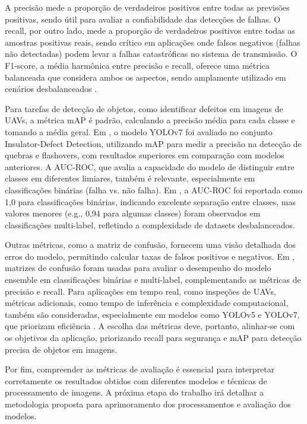 A precisão mede a proporção de verdadeiros positivos entre todas as previsões positivas, sendo útil para avaliar a confiabilidade das detecções de falhas. O recall, por outro lado, mede a proporção de verdadeiros positivos entre todas as amostras positivas reais, sendo crítico em aplicações onde falsos negativos (falhas não detectadas) podem levar a falhas catastróficas no sistema de transmissão. O F1-score, a média harmônica entre precisão e recall, oferece uma métrica balanceada que considera ambos os aspectos, sendo amplamente utilizado em cenários desbalanceados \cite{johnson2019survey}.

Para tarefas de detecção de objetos, como identificar defeitos em imagens de UAVs, a métrica mAP é padrão, calculando a precisão média para cada classe e tomando a média geral. Em , o modelo YOLOv7 foi avaliado no conjunto Insulator-Defect Detection, utilizando mAP para medir a precisão na detecção de quebras e flashovers, com resultados superiores em comparação com modelos anteriores. A AUC-ROC, que avalia a capacidade do modelo de distinguir entre classes em diferentes limiares, também é relevante, especialmente em classificações binárias (falha vs. não falha). Em , a AUC-ROC foi reportada como 1,0 para classificações binárias, indicando excelente separação entre classes, mas valores menores (e.g., 0,94 para algumas classes) foram observados em classificações multi-label, refletindo a complexidade de datasets desbalanceados.

Outras métricas, como a matriz de confusão, fornecem uma visão detalhada dos erros do modelo, permitindo calcular taxas de falsos positivos e negativos. Em , matrizes de confusão foram usadas para avaliar o desempenho do modelo ensemble em classificações binárias e multi-label, complementando as métricas de precisão e recall. Para aplicações em tempo real, como inspeções de UAVs, métricas adicionais, como tempo de inferência e complexidade computacional, também são consideradas, especialmente em modelos como YOLOv5 e YOLOv7, que priorizam eficiência \cite{peng2023edf}. A escolha das métricas deve, portanto, alinhar-se com os objetivos da aplicação, priorizando recall para segurança e mAP para detecção precisa de objetos em imagens.

Por fim, compreender as métricas de avaliação é essencial para interpretar corretamente os resultados obtidos com diferentes modelos e técnicas de processamento de imagens. A próxima etapa do trabalho irá detalhar a metodologia proposta para aprimoramento dos processamentos e avaliação dos modelos.

